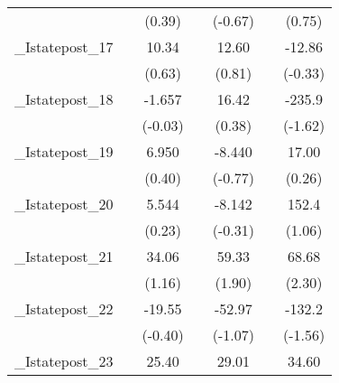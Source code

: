 {\begin{tabular}{l*{6}{c}}
            &                     &      (0.39)         &                     &     (-0.67)         &                     &      (0.75)         \\
[1em]
\_Istatepost\_17&                     &       10.34         &                     &       12.60         &                     &      -12.86         \\
            &                     &      (0.63)         &                     &      (0.81)         &                     &     (-0.33)         \\
[1em]
\_Istatepost\_18&                     &      -1.657         &                     &       16.42         &                     &      -235.9         \\
            &                     &     (-0.03)         &                     &      (0.38)         &                     &     (-1.62)         \\
[1em]
\_Istatepost\_19&                     &       6.950         &                     &      -8.440         &                     &       17.00         \\
            &                     &      (0.40)         &                     &     (-0.77)         &                     &      (0.26)         \\
[1em]
\_Istatepost\_20&                     &       5.544         &                     &      -8.142         &                     &       152.4         \\
            &                     &      (0.23)         &                     &     (-0.31)         &                     &      (1.06)         \\
[1em]
\_Istatepost\_21&                     &       34.06         &                     &       59.33         &                     &       68.68\sym{*}  \\
            &                     &      (1.16)         &                     &      (1.90)         &                     &      (2.30)         \\
[1em]
\_Istatepost\_22&                     &      -19.55         &                     &      -52.97         &                     &      -132.2         \\
            &                     &     (-0.40)         &                     &     (-1.07)         &                     &     (-1.56)         \\
[1em]
\_Istatepost\_23&                     &       25.40         &                     &       29.01\sym{*}  &                     &       34.60         \\

\end{tabular}}
